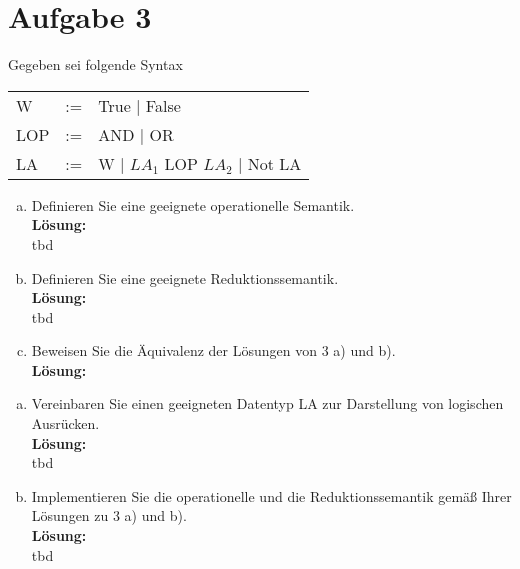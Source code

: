\documentclass[11pt,a4paper,ngerman]{article}
\begin{document}

\section*{Aufgabe 3}

Gegeben sei folgende Syntax
\begin{tabular}{lcl}
W   & := &  True | False\\
LOP & := &  AND | OR\\
LA  & := &  W | $LA_1$ LOP $LA_2$ | Not LA 
\end{tabular}

\begin{enumerate}[a)]
    \item   Definieren Sie eine geeignete operationelle Semantik.\\
            \textbf{Lösung:}\\
            tbd

    \item   Definieren Sie eine geeignete Reduktionssemantik.\\
            \textbf{Lösung:}\\
            tbd
    \item   Beweisen Sie die Äquivalenz der Lösungen von 3 a) und b).\\
            \textbf{Lösung:}\\
\end{enumerate}


\begin{enumerate}[a)]
    \item   Vereinbaren Sie einen geeigneten Datentyp LA zur Darstellung 
            von logischen Ausrücken.\\
            \textbf{Lösung:}\\
            tbd

    \item   Implementieren Sie die operationelle und die Reduktionssemantik
            gemäß Ihrer Lösungen zu 3 a) und b).\\
            \textbf{Lösung:}\\
            tbd
\end{enumerate}
\label{LastPage}
\end{document}
